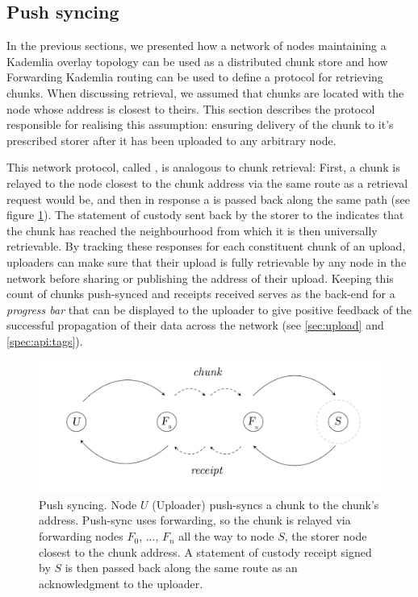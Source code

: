 \subsection{Push syncing\statusgreen}\label{sec:push-syncing}
 
In the previous sections, we presented how a network of nodes maintaining a Kademlia overlay topology can be used as a distributed chunk store and how Forwarding Kademlia routing can be used to define a protocol for retrieving chunks.
When discussing retrieval, we assumed that chunks are located with the node whose address is closest to theirs. This section describes the protocol responsible for realising this assumption: ensuring delivery of the chunk to it's prescribed storer after it has been uploaded to any arbitrary node.

This network protocol, called , is analogous to chunk retrieval: First, a chunk is relayed to the node closest to the chunk address via the same route as a retrieval request would be, and then in response a  is passed back along the same path (see figure \ref{fig:push-syncing}). The statement of custody sent back by the storer to the  indicates that the chunk has reached the neighbourhood from which it is then universally retrievable. By tracking these responses for each constituent chunk of an upload, uploaders can make sure that their upload is fully retrievable by any node in the network before sharing or publishing the address of their upload. Keeping this count of chunks push-synced and receipts received serves as the back-end for a \emph{progress bar} that can be displayed to the uploader to give positive feedback of the successful propagation of their data across the network (see \ref{sec:upload} and \ref{spec:api:tags}).


\begin{figure}[htbp]
   \centering
   \includegraphics[width=\textwidth]{fig/push-sync.pdf}
   \caption[Push syncing \statusgreen]{Push syncing. Node $U$ (Uploader) push-syncs a chunk to the chunk's address. Push-sync uses forwarding, so the chunk is relayed via forwarding nodes $F_0$, ..., $F_n$ all the way to node $S$, the storer node closest to the chunk address. A statement of custody receipt signed by $S$ is then passed back along the same route as an acknowledgment to the uploader.}
   \label{fig:push-syncing}
\end{figure}


